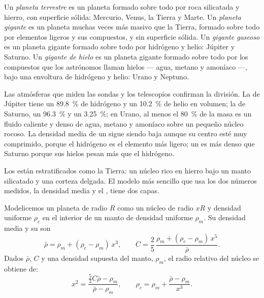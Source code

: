 \begin{definition}\label{def:b1:comparative-planetology:planet-types}
Un \emph{planeta terrestre} es un planeta formado sobre todo por roca
silicatada y hierro, con superficie sólida: Mercurio, Venus, la Tierra y Marte. Un
\emph{planeta gigante} es un planeta muchas veces más masivo que la
Tierra, formado sobre todo por elementos ligeros y sus compuestos, y sin superficie sólida. Un
\emph{gigante gaseoso} es un planeta gigante formado sobre todo por
hidrógeno y helio: Júpiter y Saturno. Un \emph{gigante de hielo} es un
planeta gigante formado sobre todo por los compuestos que los astrónomos llaman hielos --- agua,
metano y amoníaco ---, bajo una envoltura de hidrógeno y helio: Urano y Neptuno.
\end{definition}

Las atmósferas que miden las sondas y los telescopios confirman la división. La de Júpiter tiene
un \qty{89.8}{\percent} de hidrógeno y un \qty{10.2}{\percent} de helio en volumen; la de
Saturno, un \qty{96.3}{\percent} y un \qty{3.25}{\percent}; en Urano, al menos el
\qty{80}{\percent} de la masa es un fluido caliente y denso de agua, metano y amoníaco sobre un
pequeño núcleo rocoso. La densidad media de un  sigue siendo baja aunque su
centro esté muy comprimido, porque el hidrógeno es el elemento más ligero; un 
es más denso que Saturno porque sus hielos pesan más que el hidrógeno.

Los  están estratificados como la Tierra: un núcleo rico en hierro bajo un
manto silicatado y una corteza delgada. El modelo más sencillo que usa los dos números medidos,
la densidad media y el , tiene dos capas.

\begin{proposition}\label{prop:b1:comparative-planetology:two-layer}
Modelicemos un planeta de radio $R$ como un núcleo de radio $xR$ y densidad uniforme $\rho_c$
en el interior de un manto de densidad uniforme $\rho_m$. Su densidad media y su  son
\[
  \bar\rho = \rho_m + (\rho_c - \rho_m)\,x^3 , \qquad
  C = \frac25\,\frac{\rho_m + (\rho_c - \rho_m)\,x^5}{\bar\rho} .
\]
Dados $\bar\rho$, $C$ y una densidad supuesta del manto, $\rho_m$, el radio relativo del núcleo
se obtiene de:
\[
  x^2 = \frac{\tfrac52C\bar\rho - \rho_m}{\bar\rho - \rho_m} ,
  \qquad \rho_c = \rho_m + \frac{\bar\rho - \rho_m}{x^3} .
\]
\end{proposition}

